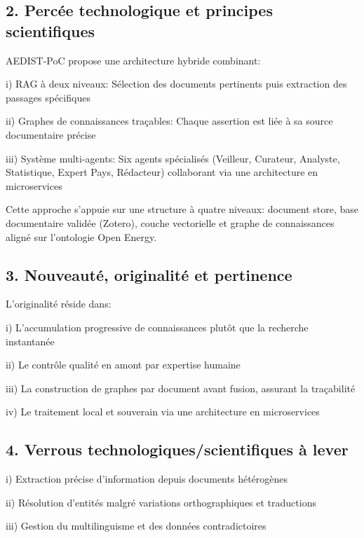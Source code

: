 \documentclass[a4paper,11pt]{report}
\begin{document}
\subsection{2. Percée technologique et principes scientifiques}\label{percuxe9e-technologique-et-principes-scientifiques}

AEDIST-PoC propose une architecture hybride combinant:

i) RAG à deux niveaux: Sélection des documents pertinents puis extraction des passages spécifiques

ii) Graphes de connaissances traçables: Chaque assertion est liée à sa source documentaire précise

iii) Système multi-agents: Six agents spécialisés (Veilleur, Curateur, Analyste, Statistique, Expert Pays, Rédacteur) collaborant via une architecture en microservices

Cette approche s'appuie sur une structure à quatre niveaux: document store, base documentaire validée (Zotero), couche vectorielle et graphe de connaissances aligné sur l'ontologie Open Energy.

\subsection{3. Nouveauté, originalité et pertinence}\label{nouveautuxe9-originalituxe9-et-pertinence}

L'originalité réside dans:

i) L'accumulation progressive de connaissances plutôt que la recherche instantanée

ii) Le contrôle qualité en amont par expertise humaine

iii) La construction de graphes par document avant fusion, assurant la traçabilité

iv) Le traitement local et souverain via une architecture en microservices

\subsection{4. Verrous technologiques/scientifiques à lever}\label{verrous-technologiquesscientifiques-uxe0-lever}

i) Extraction précise d'information depuis documents hétérogènes

ii) Résolution d'entités malgré variations orthographiques et traductions

iii) Gestion du multilinguisme et des données contradictoires
\end{document}
